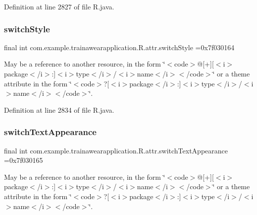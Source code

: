 Definition at line 2827 of file R.\+java.

\mbox{\label{classcom_1_1example_1_1trainawearapplication_1_1_r_1_1attr_abeb5a29b86af04b32da7fe821d2b4c8b}} 
\subsubsection{\texorpdfstring{switchStyle}{switchStyle}}
{\footnotesize\ttfamily final int com.\+example.\+trainawearapplication.\+R.\+attr.\+switch\+Style =0x7f030164\hspace{0.3cm}{\ttfamily [static]}}

May be a reference to another resource, in the form \char`\"{}$<$code$>$@\mbox{[}+\mbox{]}\mbox{[}$<$i$>$package$<$/i$>$\+:\mbox{]}$<$i$>$type$<$/i$>$/$<$i$>$name$<$/i$>$$<$/code$>$\char`\"{} or a theme attribute in the form \char`\"{}$<$code$>$?\mbox{[}$<$i$>$package$<$/i$>$\+:\mbox{]}$<$i$>$type$<$/i$>$/$<$i$>$name$<$/i$>$$<$/code$>$\char`\"{}. 

Definition at line 2834 of file R.\+java.

\mbox{\label{classcom_1_1example_1_1trainawearapplication_1_1_r_1_1attr_afff80002ac9684ea105ae366eddf0dd7}} 
\subsubsection{\texorpdfstring{switchTextAppearance}{switchTextAppearance}}
{\footnotesize\ttfamily final int com.\+example.\+trainawearapplication.\+R.\+attr.\+switch\+Text\+Appearance =0x7f030165\hspace{0.3cm}{\ttfamily [static]}}

May be a reference to another resource, in the form \char`\"{}$<$code$>$@\mbox{[}+\mbox{]}\mbox{[}$<$i$>$package$<$/i$>$\+:\mbox{]}$<$i$>$type$<$/i$>$/$<$i$>$name$<$/i$>$$<$/code$>$\char`\"{} or a theme attribute in the form \char`\"{}$<$code$>$?\mbox{[}$<$i$>$package$<$/i$>$\+:\mbox{]}$<$i$>$type$<$/i$>$/$<$i$>$name$<$/i$>$$<$/code$>$\char`\"{}. 

